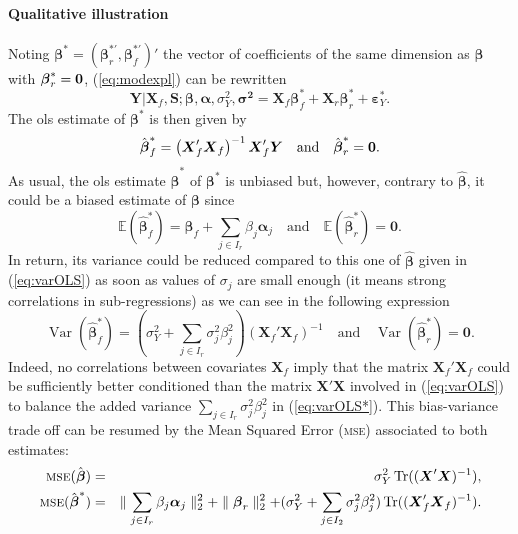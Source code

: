 \documentclass[11pt,a4paper]{article}
\begin{document}
\paragraph{Qualitative illustration} Noting $\boldsymbol{\beta}^*=(\boldsymbol{\beta}_r^{*'},\boldsymbol{\beta}_f^{*'})'$ the vector of coefficients of the same dimension as $\boldsymbol{\beta}$ with $\boldsymbol{\beta}_r^*={\bf 0}$, (\ref{eq:modexpl}) can be rewritten
\begin{equation}
	\boldsymbol{Y}{|\boldsymbol{X}_f,\boldsymbol{S}};\boldsymbol{\beta},\boldsymbol{\alpha},\sigma_Y^2,\boldsymbol{\sigma^2}=\boldsymbol{X}_f\boldsymbol{\beta}_f^*+\boldsymbol{X}_r\boldsymbol{\beta}_r^*+\boldsymbol{\varepsilon}_Y^*.\label{eq:modexpl2}
\end{equation}
The {\sc ols} estimate of $\boldsymbol{\beta}^*$ is then given by
	\begin{equation}
		\hat{\boldsymbol{\beta}}^*_f=\left(\boldsymbol{X}_f'\boldsymbol{X}_f \right) ^{-1}\boldsymbol{X}_f'\boldsymbol{Y} \quad \mbox{and} \quad \hat{\boldsymbol{\beta}}^*_r = {\bf 0}.
	\end{equation}
As usual, the {\sc ols} estimate $\hat{\boldsymbol{\beta}}^*$ of $\boldsymbol{\beta}^*$ is unbiased but, however, contrary to $\hat{\boldsymbol{\beta}}$, it could be a biased estimate of $\boldsymbol{\beta}$ since
		\begin{equation}
			\mathbb{E}(\hat{\boldsymbol{\beta}}_f^*)=\boldsymbol{\beta}_f+\sum_{j \in I_r}\beta_{j}\boldsymbol{\alpha}_j \quad \textrm{and}\quad \mathbb{E}(\hat{\boldsymbol{\beta}}_r^*)=\boldsymbol{0}.
		\end{equation}
In return, its variance could be reduced compared to this one of $\hat{\boldsymbol{\beta}}$ given in (\ref{eq:varOLS}) as soon as values of $\sigma_j$ are small enough (it means strong correlations in sub-regressions) as we can see in the following expression
		\begin{equation}
			\operatorname{Var}(\hat{\boldsymbol{\beta}}_f^*)= (\sigma^2_Y+\sum_{j \in I_r}\sigma^2_{j}\beta_{j}^2)(\boldsymbol{X}_f' \boldsymbol{X}_f)^{-1} \quad \textrm{and} \quad\operatorname{Var}(\hat{\boldsymbol{\beta}}_r^*)= \boldsymbol{0}. \label{eq:varOLS*}
		\end{equation}
Indeed, no correlations between covariates $\boldsymbol{X}_f$ imply that the matrix $\boldsymbol{X}_f' \boldsymbol{X}_f$ could be sufficiently better conditioned than the matrix $\boldsymbol{X}' \boldsymbol{X}$ involved in (\ref{eq:varOLS}) to balance the added variance $\sum_{j \in I_r}\sigma^2_{j}\beta_{j}^2$ in (\ref{eq:varOLS*}). This bias-variance trade off can be resumed by the Mean Squared Error (\textsc{mse}) associated to both estimates:
	\begin{eqnarray}
			\textsc{mse}(\hat{\boldsymbol{\beta}})&=& \sigma_Y^2 \operatorname{Tr}((\boldsymbol{X}'\boldsymbol{X})^{-1}),
			 \\
			\textsc{mse}(\hat{\boldsymbol{\beta}}^*)&=& \parallel\sum_{j \in I_r}\beta_{j}\boldsymbol{\alpha}_j \parallel_2^2 +\parallel \boldsymbol{\beta}_r\parallel^2_2 + (\sigma^2_Y+\sum_{j \in I_2}\sigma^2_{j}\beta_{j}^2 ) \operatorname{Tr}((\boldsymbol{X}_f' \boldsymbol{X}_f)^{-1}).
	\end{eqnarray}	 
\end{document}
